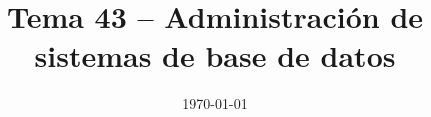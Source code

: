 \documentclass[12pt]{report}
\title{\textbf{Tema 43 – Administración de sistemas de base de datos}}
\author{}
\date{\today}
\begin{document}
\maketitle
\tableofcontents
\bigskip









\end{document}

